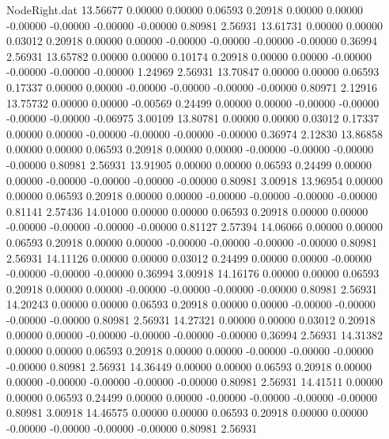 \begin{filecontents}{NodeRight.dat}
  13.56677    0.00000    0.00000     0.06593    0.20918    0.00000    0.00000   -0.00000   -0.00000   -0.00000   -0.00000    0.80981    2.56931
  13.61731    0.00000    0.00000     0.03012    0.20918    0.00000    0.00000   -0.00000   -0.00000   -0.00000   -0.00000    0.36994    2.56931
  13.65782    0.00000    0.00000     0.10174    0.20918    0.00000    0.00000   -0.00000   -0.00000   -0.00000   -0.00000    1.24969    2.56931
  13.70847    0.00000    0.00000     0.06593    0.17337    0.00000    0.00000   -0.00000   -0.00000   -0.00000   -0.00000    0.80971    2.12916
  13.75732    0.00000    0.00000    -0.00569    0.24499    0.00000    0.00000   -0.00000   -0.00000   -0.00000   -0.00000   -0.06975    3.00109
  13.80781    0.00000    0.00000     0.03012    0.17337    0.00000    0.00000   -0.00000   -0.00000   -0.00000   -0.00000    0.36974    2.12830
  13.86858    0.00000    0.00000     0.06593    0.20918    0.00000    0.00000   -0.00000   -0.00000   -0.00000   -0.00000    0.80981    2.56931
  13.91905    0.00000    0.00000     0.06593    0.24499    0.00000    0.00000   -0.00000   -0.00000   -0.00000   -0.00000    0.80981    3.00918
  13.96954    0.00000    0.00000     0.06593    0.20918    0.00000    0.00000   -0.00000   -0.00000   -0.00000   -0.00000    0.81141    2.57436
  14.01000    0.00000    0.00000     0.06593    0.20918    0.00000    0.00000   -0.00000   -0.00000   -0.00000   -0.00000    0.81127    2.57394
  14.06066    0.00000    0.00000     0.06593    0.20918    0.00000    0.00000   -0.00000   -0.00000   -0.00000   -0.00000    0.80981    2.56931
  14.11126    0.00000    0.00000     0.03012    0.24499    0.00000    0.00000   -0.00000   -0.00000   -0.00000   -0.00000    0.36994    3.00918
  14.16176    0.00000    0.00000     0.06593    0.20918    0.00000    0.00000   -0.00000   -0.00000   -0.00000   -0.00000    0.80981    2.56931
  14.20243    0.00000    0.00000     0.06593    0.20918    0.00000    0.00000   -0.00000   -0.00000   -0.00000   -0.00000    0.80981    2.56931
  14.27321    0.00000    0.00000     0.03012    0.20918    0.00000    0.00000   -0.00000   -0.00000   -0.00000   -0.00000    0.36994    2.56931
  14.31382    0.00000    0.00000     0.06593    0.20918    0.00000    0.00000   -0.00000   -0.00000   -0.00000   -0.00000    0.80981    2.56931
  14.36449    0.00000    0.00000     0.06593    0.20918    0.00000    0.00000   -0.00000   -0.00000   -0.00000   -0.00000    0.80981    2.56931
  14.41511    0.00000    0.00000     0.06593    0.24499    0.00000    0.00000   -0.00000   -0.00000   -0.00000   -0.00000    0.80981    3.00918
  14.46575    0.00000    0.00000     0.06593    0.20918    0.00000    0.00000   -0.00000   -0.00000   -0.00000   -0.00000    0.80981    2.56931

\end{filecontents}
